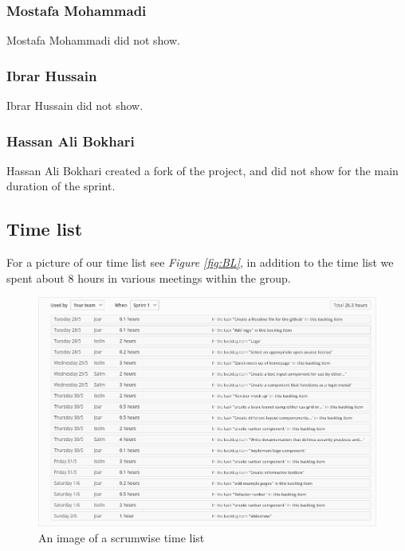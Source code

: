 \documentclass[12pt]{article}
\begin{document}
\subsubsection{Mostafa Mohammadi}
Mostafa Mohammadi did not show.
\subsubsection{Ibrar Hussain}
Ibrar Hussain did not show.
\subsubsection{Hassan Ali Bokhari}
Hassan Ali Bokhari created a fork of the project, and did not show for the main duration of the sprint.

\subsection{Time list}

For a picture of our time list see \textit{Figure \ref{fig:BL}}, in addition to the time list we spent about 8 hours in various meetings within the group.
\begin{figure}[h]
    \begin{adjustwidth}{-1in}{-1in}
        \centering
        \includegraphics[scale=0.5]{timelist.png}
        \caption{An image of a scrumwise time list}
        \label{fig:TL}
    \end{adjustwidth}
\end{figure}
\clearpage
\end{document}
